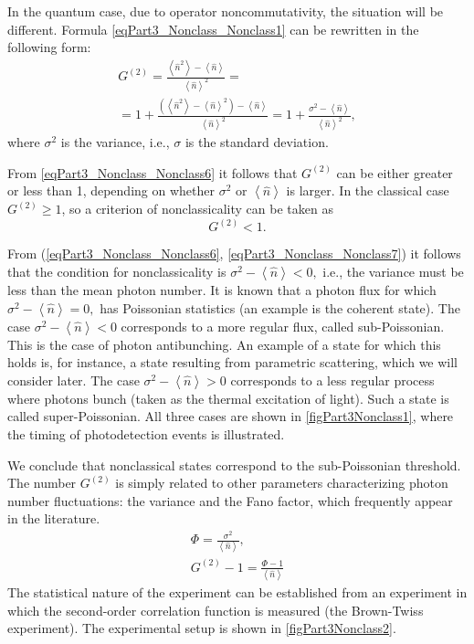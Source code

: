 In the quantum case, due to operator noncommutativity, the situation will be
different. Formula \eqref{eqPart3_Nonclass_Nonclass1} can be rewritten in the following
form:
\begin{eqnarray}
G^{(2)} = \frac{\left<\hat{n}^2\right> - \left<\hat{n}\right>}{\left<\hat{n}\right>^2} = 
\nonumber \\
=
1 + \frac{\left(\left<\hat{n}^2\right> - \left<\hat{n}\right>^2\right) -
  \left<\hat{n}\right>}{\left<\hat{n}\right>^2} = 1 + \frac{\sigma^2 -
  \left<\hat{n}\right>}{\left<\hat{n}\right>^2}, 
\label{eqPart3_Nonclass_Nonclass6}
\end{eqnarray}
where $\sigma^2$ is the variance,
i.e., $\sigma$ is the standard deviation.

From \eqref{eqPart3_Nonclass_Nonclass6} it follows that $G^{(2)}$ can
be either greater or less than 1, depending on whether $\sigma^2$ or
$\left<\hat{n}\right>$ is larger. In the classical case $G^{(2)} \ge 1$, so
a criterion of nonclassicality can be taken as 
\begin{equation}
G^{(2)} < 1.
\label{eqPart3_Nonclass_Nonclass7}
\end{equation}

From (\ref{eqPart3_Nonclass_Nonclass6},
\ref{eqPart3_Nonclass_Nonclass7}) it follows that the condition for nonclassicality
is 
\(
\sigma^2 - \left<\hat{n}\right> < 0,
\) 
i.e., the variance must be less than the mean photon number. 
It is known that a photon flux for which
\(
\sigma^2 - \left<\hat{n}\right> = 0,
\)
has Poissonian statistics (an example is the coherent state). 
The case 
\(
\sigma^2 - \left<\hat{n}\right> < 0
\)
corresponds to a more regular flux, called sub-Poissonian. This is the case of photon antibunching. An example
of a state for which this holds is, for instance, a state resulting from parametric scattering,
which we will consider later. The case
\(
\sigma^2 - \left<\hat{n}\right> > 0
\)
corresponds to a less regular process where photons bunch
(taken as the thermal excitation of light). Such a state
is called super-Poissonian. All three cases are shown in
\autoref{figPart3Nonclass1}, where the timing of photodetection events is illustrated.



We conclude that nonclassical states correspond to the
sub-Poissonian threshold. The number $G^{(2)}$ is simply related to other
parameters characterizing photon number fluctuations: the variance and
the Fano factor, which frequently appear in the literature.
\begin{eqnarray}
\Phi  = \frac{\sigma^2}{\left<\hat{n}\right>},
\nonumber \\
G^{(2)} - 1 = \frac{\Phi - 1}{\left<\hat{n}\right>}
\nonumber
\end{eqnarray}
The statistical nature of the experiment can be established from an experiment
in which the second-order correlation function is measured
(the Brown-Twiss experiment). The experimental setup is shown in
\autoref{figPart3Nonclass2}.

